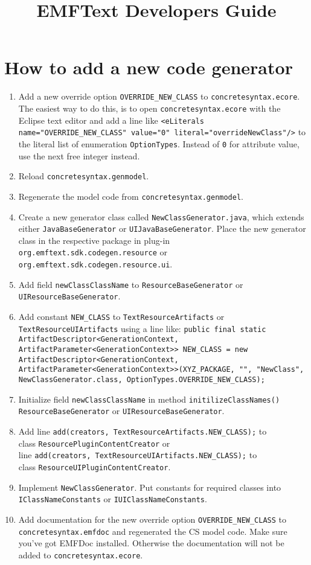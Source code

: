 \documentclass{scrartcl}
\title{EMFText Developers Guide}
\begin{document}
\section{How to add a new code generator}

\begin{enumerate}
	\item Add a new override option \texttt{OVERRIDE\_NEW\_CLASS} to 
		  \texttt{concretesyntax.ecore}. The easiest way to do this, is to open
		  \texttt{concretesyntax.ecore} with the Eclipse text editor and add a
		  line like \texttt{<eLiterals name="OVERRIDE\_NEW\_CLASS" value="0"
		  literal="overrideNewClass"/>} to the literal list of enumeration
		  \texttt{OptionTypes}. Instead of \texttt{0} for attribute value, use
		  the next free integer instead.
	\item Reload \texttt{concretesyntax.genmodel}.
	\item Regenerate the model code from \texttt{concretesyntax.genmodel}.
	\item Create a new generator class called \texttt{NewClassGenerator.java},
		  which extends either \texttt{JavaBaseGenerator} or
		  \texttt{UIJavaBaseGenerator}. Place the new generator class in the
		  respective package in plug-in 
		  \texttt{org.emftext.sdk.codegen.resource} or
		  \texttt{org.emftext.sdk.codegen.resource.ui}.
	\item Add field \texttt{newClassClassName} to \texttt{ResourceBaseGenerator}
		  or \texttt{UIResourceBaseGenerator}.
	\item Add constant \texttt{NEW\_CLASS} to \texttt{TextResourceArtifacts} or
		  \texttt{TextResourceUIArtifacts} using a line like:
		  \texttt{public final static ArtifactDescriptor<GenerationContext,
	ArtifactParameter<GenerationContext>> NEW\_CLASS = new
	ArtifactDescriptor<GenerationContext,
	ArtifactParameter<GenerationContext>>(XYZ\_PACKAGE, "", "NewClass",
	NewClassGenerator.class, OptionTypes.OVERRIDE\_NEW\_CLASS);}
	
	\item Initialize field \texttt{newClassClassName} in method
		  \texttt{initilizeClassNames()} \texttt{ResourceBaseGenerator} or
		  \texttt{UIResourceBaseGenerator}.
		  
	\item Add line \texttt{add(creators, TextResourceArtifacts.NEW\_CLASS);} to\\
		  class \texttt{ResourcePluginContentCreator} or \\
	line \texttt{add(creators, TextResourceUIArtifacts.NEW\_CLASS);} to\\ 
		  class \texttt{ResourceUIPluginContentCreator}.
		  
	\item Implement \texttt{NewClassGenerator}. Put constants for required
		  classes into \texttt{IClassNameConstants} or 
		  \texttt{IUIClassNameConstants}.
	\item Add documentation for the new override option
		  \texttt{OVERRIDE\_NEW\_CLASS} to \texttt{concretesyntax.emfdoc} and
		  regenerated the CS model code. Make sure you've got EMFDoc installed.
		  Otherwise the documentation will not be added to
		  \texttt{concretesyntax.ecore}.
\end{enumerate}
\end{document}
